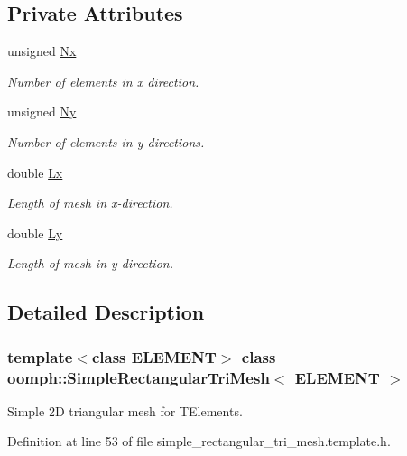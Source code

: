 \subsection*{Private Attributes}
\begin{DoxyCompactItemize}
\item 
unsigned \hyperlink{classoomph_1_1SimpleRectangularTriMesh_ad997a3ce1ed243b79cd49eb5a0687844}{Nx}
\begin{DoxyCompactList}\small\item\em Number of elements in x direction. \end{DoxyCompactList}\item 
unsigned \hyperlink{classoomph_1_1SimpleRectangularTriMesh_ac180c4ab5947c4417d912bc75621fc7e}{Ny}
\begin{DoxyCompactList}\small\item\em Number of elements in y directions. \end{DoxyCompactList}\item 
double \hyperlink{classoomph_1_1SimpleRectangularTriMesh_a85d3446550324f92540d389dfb4d063b}{Lx}
\begin{DoxyCompactList}\small\item\em Length of mesh in x-\/direction. \end{DoxyCompactList}\item 
double \hyperlink{classoomph_1_1SimpleRectangularTriMesh_adc35409d2a480d6de11d8df4ec23d1cf}{Ly}
\begin{DoxyCompactList}\small\item\em Length of mesh in y-\/direction. \end{DoxyCompactList}\end{DoxyCompactItemize}


\subsection{Detailed Description}
\subsubsection*{template$<$class E\+L\+E\+M\+E\+NT$>$\newline
class oomph\+::\+Simple\+Rectangular\+Tri\+Mesh$<$ E\+L\+E\+M\+E\+N\+T $>$}

Simple 2D triangular mesh for T\+Elements. 

Definition at line 53 of file simple\+\_\+rectangular\+\_\+tri\+\_\+mesh.\+template.\+h.



